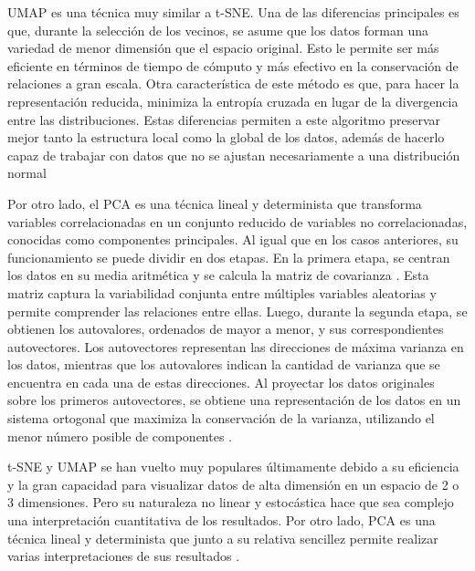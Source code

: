UMAP es una técnica muy similar a t-SNE. Una de las diferencias principales es que, durante la selección de los vecinos, se asume que los datos forman una variedad de menor dimensión que el espacio original. Esto le permite ser más eficiente en términos de tiempo de cómputo y más efectivo en la conservación de relaciones a gran escala. Otra característica de este método es que, para hacer la representación reducida, minimiza la entropía cruzada en lugar de la divergencia entre las distribuciones. Estas diferencias permiten a este algoritmo preservar mejor tanto la estructura local como la global de los datos, además de hacerlo capaz de trabajar con datos que no se ajustan necesariamente a una distribución normal \cite{McInnes2018, Becht_2018, Becht2019}

Por otro lado, el PCA es una técnica lineal y determinista que transforma variables correlacionadas en un conjunto reducido de variables no correlacionadas, conocidas como componentes principales. Al igual que en los casos anteriores, su funcionamiento se puede dividir en dos etapas. En la primera etapa, se centran los datos en su media aritmética y se calcula la matriz de covarianza \cite{Pearson1901, Hotelling1933}. Esta matriz captura la variabilidad conjunta entre múltiples variables aleatorias y permite comprender las relaciones entre ellas. Luego, durante la segunda etapa, se obtienen los autovalores, ordenados de mayor a menor, y sus correspondientes autovectores. Los autovectores representan las direcciones de máxima varianza en los datos, mientras que los autovalores indican la cantidad de varianza que se encuentra en cada una de estas direcciones. Al proyectar los datos originales sobre los primeros autovectores, se obtiene una representación de los datos en un sistema ortogonal que maximiza la conservación de la varianza, utilizando el menor número posible de componentes \cite{Lever2017, Turk1991}.

t-SNE y UMAP se han vuelto muy populares últimamente debido a su eficiencia y la gran capacidad para visualizar datos de alta dimensión en un espacio de 2 o 3 dimensiones. Pero su naturaleza no linear y estocástica hace que sea complejo una interpretación cuantitativa de los resultados. Por otro lado, PCA es una técnica lineal y determinista que junto a su relativa sencillez permite realizar varias interpretaciones de sus resultados \cite{Fodor2002}.

